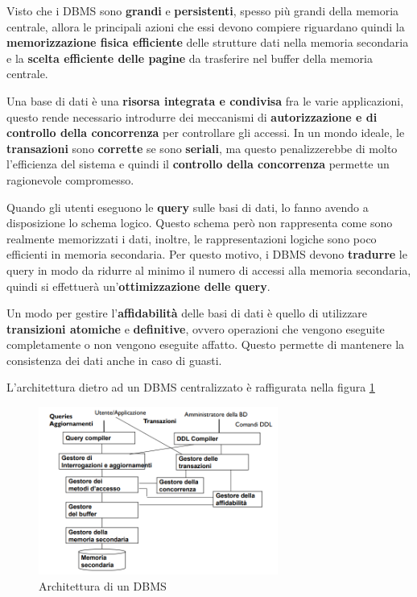 Visto che i DBMS sono \textbf{grandi} e \textbf{persistenti}, spesso più grandi 
della memoria centrale, allora le principali azioni che essi devono compiere riguardano quindi la
\textbf{memorizzazione fisica efficiente} delle strutture dati nella memoria secondaria e
la \textbf{scelta efficiente delle pagine} da trasferire nel buffer della memoria
centrale.

Una base di dati è una \textbf{risorsa integrata e condivisa} fra le varie applicazioni,
questo rende necessario introdurre dei meccanismi di \textbf{autorizzazione e di
controllo della concorrenza} per controllare gli accessi. In un mondo ideale, 
le \textbf{transazioni} sono \textbf{corrette} se
sono \textbf{seriali}, ma questo penalizzerebbe di molto l'efficienza del sistema e
quindi il \textbf{controllo della concorrenza} permette un ragionevole compromesso.

Quando gli utenti eseguono le \textbf{query} sulle basi di dati, lo fanno avendo a disposizione
lo schema logico. Questo schema però non rappresenta come sono realmente memorizzati
i dati, inoltre, le rappresentazioni logiche sono poco efficienti in memoria
secondaria. Per questo motivo, i DBMS devono \textbf{tradurre} le query in modo da ridurre
al minimo il numero di accessi alla memoria secondaria, quindi si effettuerà 
un'\textbf{ottimizzazione delle query}.

Un modo per gestire l'\textbf{affidabilità} delle basi di dati è quello di utilizzare
\textbf{transizioni atomiche} e \textbf{definitive}, ovvero operazioni che vengono eseguite completamente o
non vengono eseguite affatto. Questo permette di mantenere la consistenza dei
dati anche in caso di guasti.

L'architettura dietro ad un DBMS centralizzato è raffigurata nella figura \ref{fig:DBMS_architecture}

\begin{figure}
    \centering
    \includegraphics[width=0.7\textwidth]{./img/DBMS/Architettura.png}
    \caption{Architettura di un DBMS}
    \label{fig:DBMS_architecture}
\end{figure}

